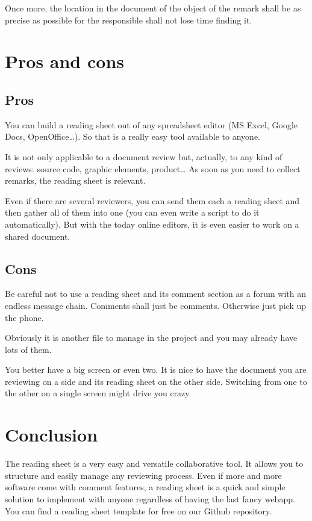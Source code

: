 Once more, the location in the document of the object of the remark shall be as precise as possible for the responsible shall not lose time finding it.

\section{Pros and cons}
\subsection{Pros}
You can build a reading sheet out of any spreadsheet editor (MS Excel, Google Docs, OpenOffice…). So that is a really easy tool available to anyone.

It is not only applicable to a document review but, actually, to any kind of reviews: source code, graphic elements, product… As soon as you need to collect remarks, the reading sheet is relevant.

Even if there are several reviewers, you can send them each a reading sheet and then gather all of them into one (you can even write a script to do it automatically). But with the today online editors, it is even easier to work on a shared document.
\subsection{Cons}
Be careful not to use a reading sheet and its comment section as a forum with an endless message chain. Comments shall just be comments. Otherwise just pick up the phone.

Obviously it is another file to manage in the project and you may already have lots of them.

You better have a big screen or even two. It is nice to have the document you are reviewing on a side and its reading sheet on the other side. Switching from one to the other on a single screen might drive you crazy.

\section{Conclusion}
The reading sheet is a very easy and versatile collaborative tool. It allows you to structure and easily manage any reviewing process. Even if more and more software come with comment features, a reading sheet is a quick and simple solution to implement with anyone regardless of having the last fancy webapp. You can find a reading sheet template for free on our Github repository.

